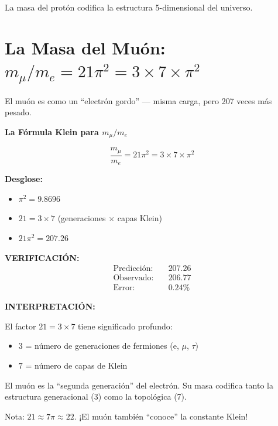 La masa del protón codifica la estructura 5-dimensional del universo.


\section{La Masa del Muón: $m_\mu/m_e = 21\pi^2 = 3 \times 7 \times \pi^2$}

El muón es como un ``electrón gordo'' --- misma carga, pero 207 veces más pesado.

\begin{nivelmatematico}
\textbf{La Fórmula Klein para $m_\mu/m_e$}

\begin{equation}
\boxed{\frac{m_\mu}{m_e} = 21\pi^2 = 3 \times 7 \times \pi^2}
\end{equation}

\textbf{Desglose:}
\begin{itemize}
    \item $\pi^2 = 9.8696$
    \item $21 = 3 \times 7$ (generaciones $\times$ capas Klein)
    \item $21\pi^2 = 207.26$
\end{itemize}

\textbf{VERIFICACIÓN:}
\begin{align}
\text{Predicción:} & \quad 207.26\\
\text{Observado:} & \quad 206.77\\
\text{Error:} & \quad 0.24\%
\end{align}
\end{nivelmatematico}

\textbf{INTERPRETACIÓN:}

El factor $21 = 3 \times 7$ tiene significado profundo:
\begin{itemize}
    \item $3$ = número de generaciones de fermiones (e, $\mu$, $\tau$)
    \item $7$ = número de capas de Klein
\end{itemize}

El muón es la ``segunda generación'' del electrón.
Su masa codifica tanto la estructura generacional (3) como la topológica (7).

Nota: $21 \approx 7\pi \approx 22$. ¡El muón también ``conoce'' la constante Klein!


